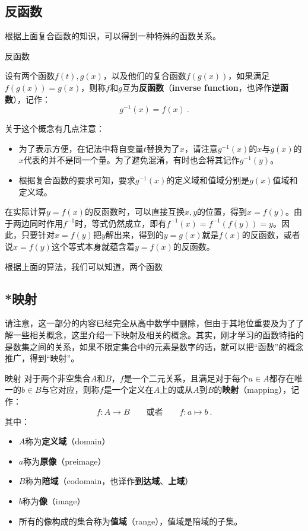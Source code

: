\subsection{反函数}

根据上面复合函数的知识，可以得到一种特殊的函数关系。

\begin{definition}{反函数}

设有两个函数$f(t),g(x)$，以及他们的复合函数$f(g(x))$，如果满足$f(g(x))=g(x)$，则称$f$和$g$互为\textbf{反函数}（\textbf{inverse function}，也译作\textbf{逆函数}），记作：
\begin{equation}
g^{-1}(x)=f(x)~.
\end{equation}
\end{definition}

关于这个概念有几点注意：
\begin{itemize}
\item 为了表示方便，在记法中将自变量$t$替换为了$x$，请注意$g^{-1}(x)$的$x$与$g(x)$的$x$代表的并不是同一个量。为了避免混淆，有时也会将其记作$g^{-1}(y)$。
\item 根据复合函数的要求可知，要求$g^{-1}(x)$的定义域和值域分别是$g(x)$值域和定义域。
\end{itemize}

在实际计算$y=f(x)$的反函数时，可以直接互换$x,y$的位置，得到$x=f(y)$。由于两边同时作用$f^{-1}$时，等式仍然成立，即有$f^{-1}(x)=f^{-1}(f(y))=y$。因此，只要针对$x=f(y)$把$y$解出来，得到的$y=g(x)$就是$f(x)$的反函数，或者说$x=f(y)$这个等式本身就蕴含着$y=f(x)$的反函数。

根据上面的算法，我们可以知道，两个函数



\subsection{*映射}

请注意，这一部分的内容已经完全从高中数学中删除，但由于其地位重要及为了了解一些相关概念，这里介绍一下映射及相关的概念。其实，刚才学习的函数特指的是数集之间的关系，如果不限定集合中的元素是数字的话，就可以把“函数”的概念推广，得到“映射”。

\begin{definition}{映射}
对于两个非空集合$A$和$B$，$f$是一个二元关系，且满足对于每个$a\in A$都存在唯一的$b\in B$与它对应，则称$f$是一个定义在$A$上的或从$A$到$B$的\textbf{映射}（mapping），记作：
\begin{equation}
f:A\to B\qquad\text{或者}\qquad f:a\mapsto b~.
\end{equation}
其中：
\begin{itemize}
\item $A$称为\textbf{定义域}（domain）
\item $a$称为\textbf{原像}（preimage）
\item $B$称为\textbf{陪域}（codomain，也译作\textbf{到达域}、\textbf{上域}）
\item $b$称为\textbf{像}（image）
\item 所有的像构成的集合称为\textbf{值域}（range），值域是陪域的子集。
\end{itemize}
\end{definition}

